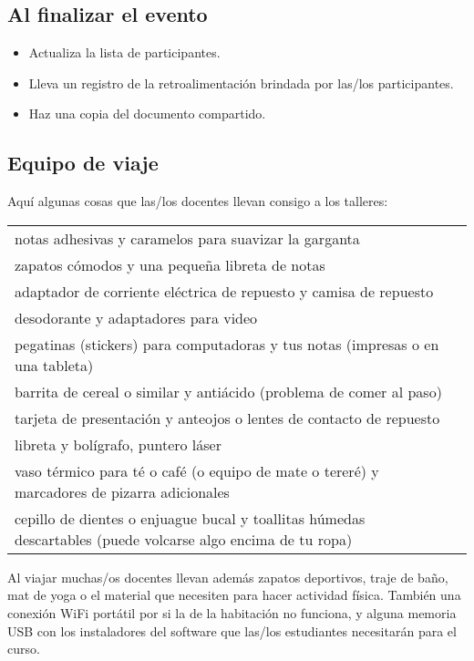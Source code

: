 \subsection*{Al finalizar el evento}

\begin{itemize}

\item
  Actualiza la lista de participantes.

\item
  Lleva un registro de la retroalimentación brindada por las/los participantes.

\item
  Haz una copia del documento compartido.

\end{itemize}

\subsection*{Equipo de viaje}

Aquí algunas cosas que las/los docentes llevan consigo a los talleres:

\begin{longtable}{p{}p{}}

notas adhesivas y caramelos para suavizar la garganta \\
zapatos cómodos y una pequeña libreta de notas \\
adaptador de corriente eléctrica de repuesto y camisa de repuesto \\
desodorante y adaptadores para video \\
pegatinas (stickers) para computadoras y tus notas (impresas o en una tableta) \\
barrita de cereal o similar y antiácido (problema de comer al paso) \\
tarjeta de presentación y anteojos o lentes de contacto de repuesto \\
libreta y bolígrafo, puntero láser \\
vaso térmico para té o café (o equipo de mate o tereré) y marcadores de pizarra adicionales \\
cepillo de dientes o enjuague bucal y toallitas húmedas descartables (puede volcarse algo encima de tu ropa) \\

\end{longtable}

Al viajar
muchas/os docentes llevan además zapatos deportivos, traje de baño, mat de yoga
o el material que necesiten para hacer actividad física.
También una conexión WiFi portátil por si la de la habitación no funciona,
y alguna memoria USB con los instaladores del software que las/los estudiantes 
necesitarán para el curso.

